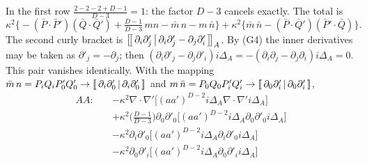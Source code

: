 In the first row $\tfrac{2-2-2+D-1}{D-3}=1$: the factor $D-3$ cancels exactly. The total is
\begin{equation}
\kappa^2\Big\{-(\bar P\!\cdot\!\bar P')(\bar Q\!\cdot\!\bar Q')+\tfrac{D-1}{D-3}\,mn-\bar m\,n-m\,\bar n\Big\}
+\kappa^2\Big\{\bar m\,\bar n-(\bar P\!\cdot\!\bar Q')(\bar P'\!\cdot\!\bar Q)\Big\}.
\label{eq:ch3-AAsum}
\end{equation}
The second curly bracket is $\left[\!\left[\,\partial_i\partial'_j\,\middle|\,\partial_i\partial'_j-\partial_j\partial'_i\,\right]\!\right]_{A}$. By (G4) the inner derivatives may be taken as
$\partial'_j=-\partial_j$; then $(\partial_i\partial'_j-\partial_j\partial'_i)i\Delta_A=-(\partial_i\partial_j-\partial_j\partial_i)i\Delta_A=0$. This pair vanishes identically.
With the mapping $\bar m\,n=P_iQ_iP'_0Q'_0\to\left[\!\left[\,\partial_i\partial'_0\,\middle|\,\partial_i\partial'_0\,\right]\!\right]_{}$ and $m\,\bar n=P_0Q_0P'_iQ'_i\to\left[\!\left[\,\partial_0\partial'_i\,\middle|\,\partial_0\partial'_i\,\right]\!\right]_{}$,
{%
\begin{equation}
\boxed{\;
\begin{aligned}
AA:\quad&-\kappa^2\nabla\!\cdot\!\nabla'\big[(aa')^{D-2}i\Delta_A\nabla\!\cdot\!\nabla'i\Delta_A\big]\\
&+\kappa^2\Big(\frac{D-1}{D-3}\Big)\partial_0\partial'_0\big[(aa')^{D-2}i\Delta_A\partial_0\partial'_0i\Delta_A\big]\\
&-\kappa^2\partial_i\partial'_0\big[(aa')^{D-2}i\Delta_A\partial_i\partial'_0i\Delta_A\big]\\
&-\kappa^2\partial_0\partial'_i\big[(aa')^{D-2}i\Delta_A\partial_0\partial'_ii\Delta_A\big]
\end{aligned}\;}
\tag{I.47$'$}\label{eq:ch3-47}
\end{equation}
}

